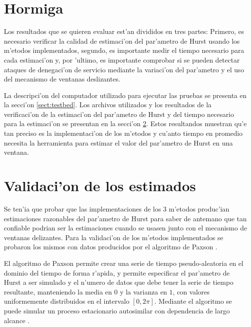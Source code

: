 \section{Hormiga}

Los resultados que se quieren evaluar est'an divididos en tres partes: 
Primero, es necesario verificar la calidad de estimaci'on del par'ametro
de Hurst usando los m'etodos implementados, segundo, es importante medir 
el tiempo necesario para cada estimaci'on y, por 'ultimo, es importante
comprobar si se pueden detectar ataques de denegaci'on de servicio mediante la
variaci'on del par'ametro y el uso del mecanismo de ventanas deslizantes.

La descripci'on del computador utilizado para ejecutar las pruebas se 
presenta en la secci'on \ref{sect:testbed}. Los archivos utilizados y los
resultados de la verificaci'on de la estimaci'on del par'ametro de Hurst y del
tiempo necesario para la estimaci'on se presentan en la secci'on
\ref{sect:validacion}. Estos resultandos muestran qu'e tan
preciso es la implementaci'on de los m'etodos y cu'anto tiempo en promedio
necesita la herramienta para estimar el valor del par'ametro de Hurst en una
ventana. 

\section{Validaci'on de los estimados} \label{sect:validacion}

Se ten'ia que probar que las implementaciones de los 3 m'etodos produc'ian
estimaciones razonables del par'ametro de Hurst para saber de antemano que tan
confiable podrian ser la estimaciones cuando se usasen junto con el mecanismo
de ventanas delizantes. Para la validaci'on de los m'etodos implementados se
probaron los mismos con datos producidos por el algoritmo de Paxson
\cite{Paxson95fastapproximation}.

El algoritmo de Paxson permite crear una serie de tiempo pseudo-aleatoria en
el dominio del tiempo de forma r'apida, y permite especificar el par'ametro de
Hurst a ser simulado y el n'umero de datos que debe tener la serie de tiempo
resultante, manteniendo la media en $0$ y la varianza en $1$, con valores
uniformemente distribuidos en el intervalo $[0,2\pi]$. Mediante el algoritmo
se puede simular un proceso estacionario autosimilar con dependencia de largo
alcance \cite{Paxson95fastapproximation}.

